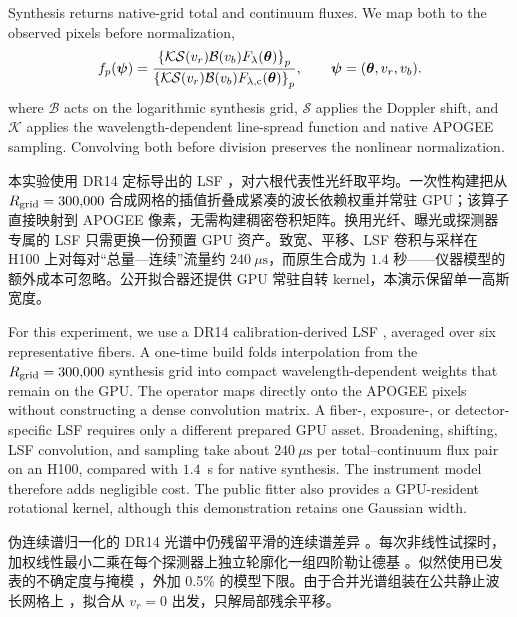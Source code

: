 \begin{EN}
Synthesis returns native-grid total and continuum fluxes. We map both to the
observed pixels before normalization,
\begin{equation}
f_p(\boldsymbol{\psi})=
\frac{\left\{\mathcal{K}\mathcal{S}(v_r)\mathcal{B}(v_b)
F_\lambda(\boldsymbol{\theta})\right\}_p}
{\left\{\mathcal{K}\mathcal{S}(v_r)\mathcal{B}(v_b)
F_{\lambda,{\rm c}}(\boldsymbol{\theta})\right\}_p},
\qquad
\boldsymbol{\psi}=(\boldsymbol{\theta},v_r,v_b).
\label{eq:apogee_forward}
\end{equation}
\noindent where $\mathcal{B}$ acts on the logarithmic synthesis grid,
$\mathcal{S}$ applies the Doppler shift, and $\mathcal{K}$ applies the
wavelength-dependent line-spread function and native APOGEE sampling.
Convolving both before division preserves the nonlinear normalization.
\end{EN}

本实验使用 DR14 定标导出的 LSF \citep{Nidever2015,Holtzman2018}，对六根代表性光纤取平均。一次性构建把从 $R_{\rm grid}=300{,}000$ 合成网格的插值折叠成紧凑的波长依赖权重并常驻 GPU；该算子直接映射到 APOGEE 像素，无需构建稠密卷积矩阵。换用光纤、曝光或探测器专属的 LSF 只需更换一份预置 GPU 资产。致宽、平移、LSF 卷积与采样在 H100 上对每对“总量—连续”流量约 $240~\mu\mathrm{s}$，而原生合成为 $1.4$ 秒——仪器模型的额外成本可忽略。公开拟合器还提供 GPU 常驻自转 kernel，本演示保留单一高斯宽度。

\begin{EN}
For this experiment, we use a DR14 calibration-derived LSF
\citep{Nidever2015,Holtzman2018}, averaged over six representative fibers. A
one-time build folds interpolation from the $R_{\rm grid}=300{,}000$ synthesis
grid into compact wavelength-dependent weights that remain on the GPU. The
operator maps directly onto the APOGEE pixels without constructing a dense
convolution matrix. A fiber-, exposure-, or detector-specific LSF requires
only a different prepared GPU asset. Broadening, shifting, LSF convolution,
and sampling take about $240~\mu\mathrm{s}$ per total--continuum flux pair on
an H100, compared with $1.4$~s for native synthesis. The instrument model
therefore adds negligible cost. The public fitter also provides a GPU-resident
rotational kernel, although this demonstration retains one Gaussian width.
\end{EN}

伪连续谱归一化的 DR14 光谱中仍残留平滑的连续谱差异 \citep{Holtzman2018}。每次非线性试探时，加权线性最小二乘在每个探测器上独立轮廓化一组四阶勒让德基 \citep{GolubPereyra2003}。似然使用已发表的不确定度与掩模 \citep{Holtzman2018}，外加 0.5\% 的模型下限。由于合并光谱组装在公共静止波长网格上 \citep{Nidever2015}，拟合从 $v_r=0$ 出发，只解局部残余平移。

